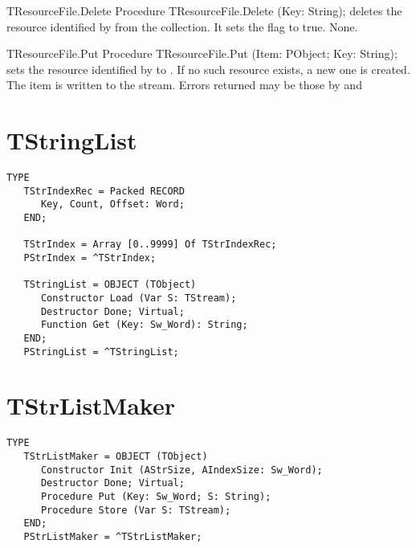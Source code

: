 \begin{procedure}{TResourceFile.Delete}
\Declaration
Procedure TResourceFile.Delete (Key: String);
\Description
{} deletes the resource identified by  from the
collection. It sets the  flag to true.
\Errors
None.
\SeeAlso
{}
\end{procedure}

\begin{procedure}{TResourceFile.Put}
\Declaration
Procedure TResourceFile.Put (Item: PObject; Key: String);
\Description
{} sets the resource identified by  to .
If no such resource exists, a new one is created. The item is written
to the stream.
\Errors
Errors returned may be those by  and 
\SeeAlso
{}
\end{procedure}

\section{TStringList}
\label{se:TStringList}

\begin{verbatim}
TYPE
   TStrIndexRec = Packed RECORD
      Key, Count, Offset: Word;
   END;

   TStrIndex = Array [0..9999] Of TStrIndexRec;
   PStrIndex = ^TStrIndex;

   TStringList = OBJECT (TObject)
      Constructor Load (Var S: TStream);
      Destructor Done; Virtual;
      Function Get (Key: Sw_Word): String;
   END;
   PStringList = ^TStringList;
\end{verbatim}

\section{TStrListMaker}
\label{se:TStrListMaker}

\begin{verbatim}
TYPE
   TStrListMaker = OBJECT (TObject)
      Constructor Init (AStrSize, AIndexSize: Sw_Word);
      Destructor Done; Virtual;
      Procedure Put (Key: Sw_Word; S: String);
      Procedure Store (Var S: TStream);
   END;
   PStrListMaker = ^TStrListMaker;
\end{verbatim}

